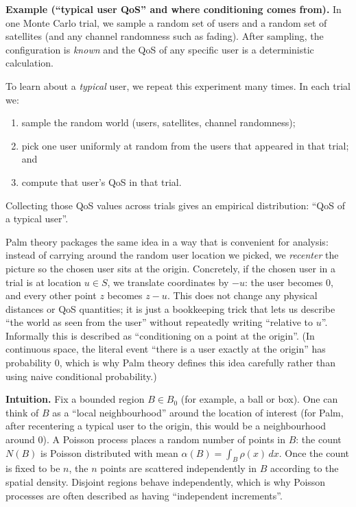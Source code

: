 \noindent\textbf{Example (``typical user QoS'' and where conditioning comes from).}
In one Monte Carlo trial, we sample a random set of users and a random set of satellites (and any channel randomness such
as fading). After sampling, the configuration is \emph{known} and the QoS of any specific user is a deterministic
calculation.

To learn about a \emph{typical} user, we repeat this experiment many times. In each trial we:
\begin{enumerate}
    \item sample the random world (users, satellites, channel randomness);
    \item pick one user uniformly at random from the users that appeared in that trial; and
    \item compute that user's QoS in that trial.
\end{enumerate}
Collecting those QoS values across trials gives an empirical distribution: ``QoS of a typical user''.

Palm theory packages the same idea in a way that is convenient for analysis: instead of carrying around the random user
location we picked, we \emph{recenter} the picture so the chosen user sits at the origin. Concretely, if the chosen user
in a trial is at location $u\in S$, we translate coordinates by $-u$: the user becomes $0$, and every other point $z$
becomes $z-u$. This does not change any physical distances or QoS quantities; it is just a bookkeeping trick that lets us
describe ``the world as seen from the user'' without repeatedly writing ``relative to $u$''. Informally this is described
as ``conditioning on a point at the origin''.
(In continuous space, the literal event ``there is a user exactly at the origin'' has probability $0$, which is why Palm
theory defines this idea carefully rather than using naive conditional probability.)

\noindent\textbf{Intuition.}
Fix a bounded region $B\in B_0$ (for example, a ball or box). One can think of $B$ as a ``local neighbourhood'' around the
location of interest (for Palm, after recentering a typical user to the origin, this would be a neighbourhood around
$0$). A Poisson process places a random number of points in $B$: the count $N(B)$ is Poisson distributed with mean
$\alpha(B)=\int_B \rho(x)\,dx$. Once the count is fixed to be $n$, the $n$ points are scattered independently in $B$
according to the spatial density. Disjoint regions behave independently, which is why Poisson processes are often
described as having ``independent increments''.

